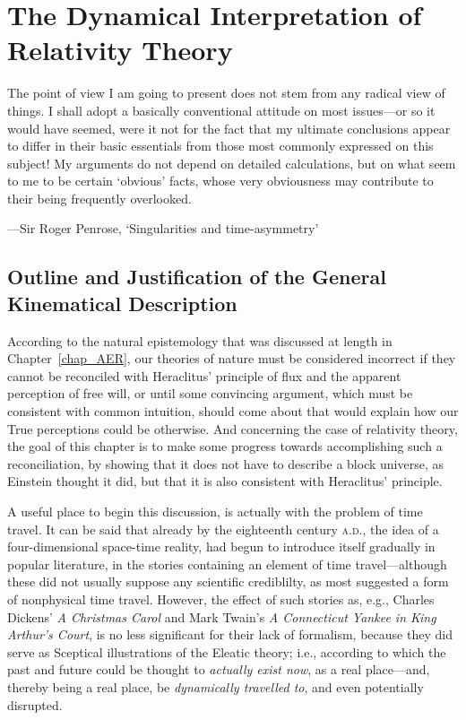 \chapter[The Dynamical Interpretation of Relativity Theory]{The Dynamical Interpretation of\\Relativity Theory\label{chap_DIRT}}
\epigraph{The point of view I am going to present does not stem from any radical view of things. I shall adopt a basically conventional attitude on most issues---or so it would have seemed, were it not for the fact that my ultimate conclusions appear to differ in their basic essentials from those most commonly expressed on this subject! My arguments do not depend on detailed calculations, but on what seem to me to be certain `obvious' facts, whose very obviousness may contribute to their being frequently overlooked.}{---Sir Roger Penrose, `Singularities and time-asymmetry'}
\section[Outline and Justification of the General Kinematical Description]{Outline and Justification of the General\\Kinematical Description\label{sec_OJGKD}}
According to the natural epistemology that was discussed at length in Chapter~\ref{chap_AER}, our theories of nature must be considered incorrect if they cannot be reconciled with Heraclitus' principle of flux and the apparent perception of free will, or until some convincing argument, which must be consistent with common intuition, should come about that would explain how our True perceptions could be otherwise. And concerning the case of relativity theory, the goal of this chapter is to make some progress towards accomplishing such a reconciliation, by showing that it does not have to describe a block universe, as Einstein thought it did, but that it is also consistent with Heraclitus' principle.

A useful place to begin this discussion, is actually with the problem of time travel. It can be said that already by the eighteenth century \textsc{a.d.}, the idea of a four-dimensional space-time reality, had begun to introduce itself gradually in popular literature, in the stories containing an element of time travel---although these did not usually suppose any scientific crediblilty, as most suggested a form of nonphysical time travel. However, the effect of such stories as, e.g., Charles Dickens' \textit{A Christmas Carol} and Mark Twain's \textit{A Connecticut Yankee in King Arthur's Court}, is no less significant for their lack of formalism, because they did serve as Sceptical illustrations of the Eleatic theory; i.e., according to which the past and future could be thought to \textit{actually exist now}, as a real place---and, thereby being a real place, be \textit{dynamically travelled to}, and even potentially disrupted. 

